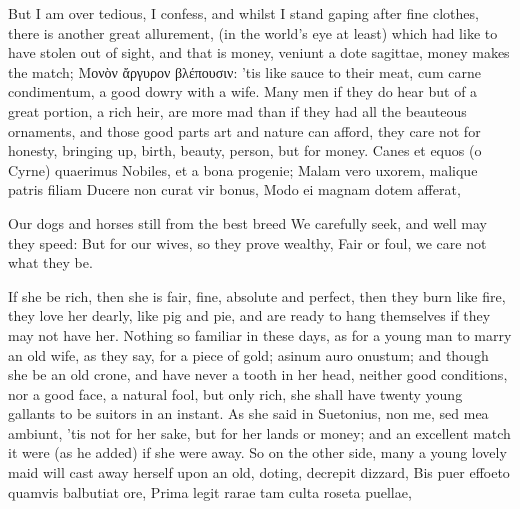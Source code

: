 But I am over tedious, I confess, and whilst I stand gaping after fine
clothes, there is another great allurement, (in the world's eye at
least) which had like to have stolen out of sight, and that is money,
veniunt a dote sagittae, money makes the match; \textgreek{Μονὸν ἄργυρον
βλέπουσιν}: 'tis like sauce to their meat, cum carne condimentum, a good
dowry with a wife. Many men if they do hear but of a great portion, a
rich heir, are more mad than if they had all the beauteous ornaments,
and those good parts art and nature can afford, they care not for
honesty, bringing up, birth, beauty, person, but for money.
Canes et equos (o Cyrne) quaerimus
Nobiles, et a bona progenie;
Malam vero uxorem, malique patris filiam
Ducere non curat vir bonus,
Modo ei magnam dotem afferat,

Our dogs and horses still from the best breed
We carefully seek, and well may they speed:
But for our wives, so they prove wealthy,
Fair or foul, we care not what they be.

If she be rich, then she is fair, fine, absolute and perfect, then they
burn like fire, they love her dearly, like pig and pie, and are ready
to hang themselves if they may not have her. Nothing so familiar in
these days, as for a young man to marry an old wife, as they say, for a
piece of gold; asinum auro onustum; and though she be an old crone, and
have never a tooth in her head, neither good conditions, nor a good
face, a natural fool, but only rich, she shall have twenty young
gallants to be suitors in an instant. As she said in Suetonius, non me,
sed mea ambiunt, 'tis not for her sake, but for her lands or money; and
an excellent match it were (as he added) if she were away. So on the
other side, many a young lovely maid will cast away herself upon an
old, doting, decrepit dizzard,
Bis puer effoeto quamvis balbutiat ore,
Prima legit rarae tam culta roseta puellae,


